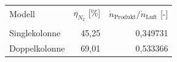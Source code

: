 \begin{tabular}{lrr}
\hline
Modell & $\eta_{N_2}$ [\%] & $\dot{n}_{\text{Produkt}} / \dot{n}_{\text{Luft}}$ [-] \\\\
\hline
Singlekolonne & 45,25 & 0,349731 \\
Doppelkolonne & 69,01 & 0,533366 \\
\hline
\end{tabular}